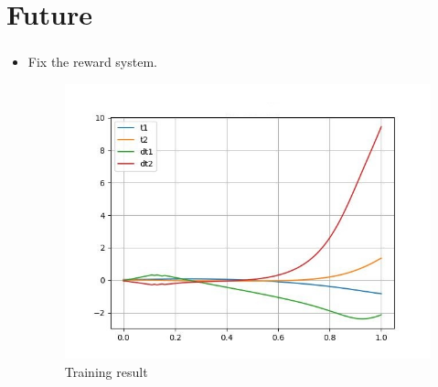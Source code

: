 \documentclass{beamer}
\begin{document}
    \section{Future}
    \begin{frame}
        \frametitle{\secname}

        \begin{itemize}
            \item Fix the reward system.
            \begin{figure}
                \includegraphics[scale=.3]{Figs/train1.jpg}
                \caption{Training result}
            \end{figure}
        \end{itemize}

    \end{frame}
\end{document}
